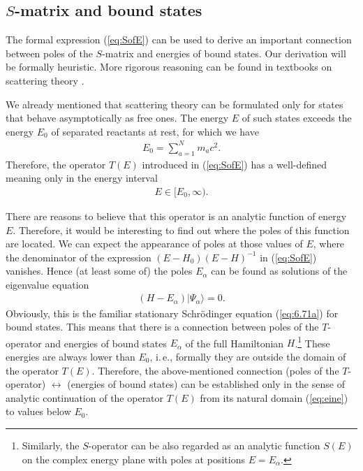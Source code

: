 \documentclass[]{stefan1}
\begin{document}
\subsection{$S$-matrix and bound states}\label{ss:s-matr-bound}
The formal expression (\ref{eq:SofE}) can be used to derive an important
connection between poles of the $ S $-matrix and energies of bound
states. Our derivation will be formally heuristic. More rigorous
reasoning can be found in textbooks on scattering theory
\cite{Goldberger,Taylor}.

We already mentioned that scattering theory can be formulated only for
states that behave asymptotically as free ones. The energy $ E $ of such
states exceeds the energy $ E_{0} $ of separated reactants at rest, for
which we have
%
\begin{align*}
E_{0} =\sum_{a=1}^{N}
m_{a}c^{2}.
\end{align*}
Therefore, the operator $ T (E) $ introduced in (\ref{eq:SofE}) has a
well-defined meaning only in the energy interval
%
\begin{align}
E \in [E_{0}, \infty ). \label{eq:eine}
\end{align}

There are reasons to believe that this operator is an analytic function
of energy~$ E $. Therefore, it would be interesting to find out where
the poles of this function are located. We can expect the appearance of
poles at those values of $ E $, where the denominator of the expression
$ (E - H_{0}) (E - H) ^{- 1} $ in (\ref{eq:SofE}) vanishes. Hence (at
least some of) the poles $ E _{\alpha } $ can be found as solutions of
the eigenvalue equation
%
\begin{align*}
(H - E_{\alpha }) |\Psi_{\alpha } \rangle = 0.
\end{align*}
Obviously, this is the familiar stationary Schr\"{o}dinger equation
(\ref{eq:6.71a}) for bound states. This means that there is a connection
between poles of the $ T $-operator and energies of bound states
$ E _{\alpha } $ of the full Hamiltonian $ H $.\footnote{Similarly,
the $S$-operator can be also regarded as an analytic function
$S(E)$ on the complex energy plane with poles at positions $E=E_{
\alpha }$.} These energies are always lower than $ E_{0} $, i.\,e.,
formally they are outside the domain of the operator $ T (E) $.
Therefore, the above-mentioned connection (poles of the $ T $-operator)
$ \leftrightarrow $ (energies of bound states) can be established only
in the sense of analytic continuation of the operator $ T (E) $ from its
natural domain (\ref{eq:eine}) to values below $ E_{0} $.
\end{document}
